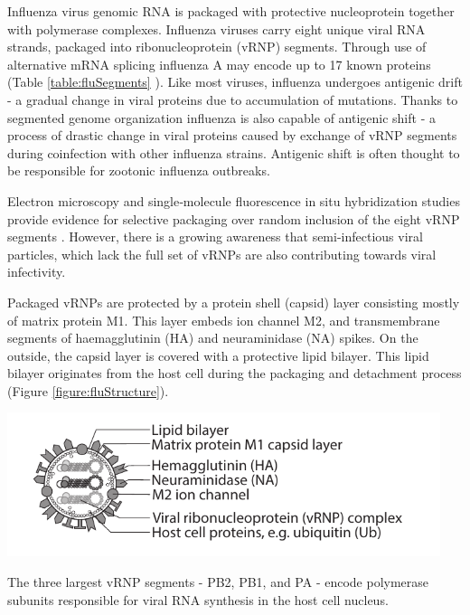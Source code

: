 Influenza virus genomic RNA is packaged with protective nucleoprotein together with polymerase complexes. Influenza viruses carry eight unique viral RNA strands, packaged into ribonucleoprotein  (vRNP) segments. Through use of alternative mRNA splicing influenza A may encode up to 17 known proteins (Table \ref{table:fluSegments} \cite{das2010structures, dubois2014influenza}). Like most viruses, influenza undergoes antigenic drift - a gradual change in viral proteins due to accumulation of mutations. Thanks to segmented genome organization influenza is also capable of antigenic shift - a process of drastic change in viral proteins caused by exchange of vRNP segments during coinfection with other influenza strains. Antigenic shift is often thought to be responsible for zootonic influenza outbreaks.

Electron microscopy and single‑molecule fluorescence in situ hybridization studies provide evidence for selective packaging over random inclusion of the eight vRNP segments \cite{eisfeld2015centre}. However, there is a growing awareness that semi-infectious viral particles, which lack the full set of vRNPs are also contributing towards viral infectivity.

Packaged vRNPs are protected by a protein shell (capsid) layer consisting mostly of matrix protein M1. This layer embeds ion channel M2, and transmembrane segments of haemagglutinin (HA) and neuraminidase (NA) spikes. On the outside, the capsid layer is covered with a protective lipid bilayer. This lipid bilayer originates from the host cell during the packaging and detachment process (Figure \ref{figure:fluStructure}).

\begin{center}
\includegraphics[width=0.95\textwidth, trim={0cm 0cm 0cm 0cm}, clip]{D_chapters/0_introduction/flu_structure.pdf}
\label{figure:fluStructure}
\end{center}

The three largest vRNP segments - PB2, PB1, and PA - encode polymerase subunits responsible for viral RNA synthesis in the host cell nucleus.

